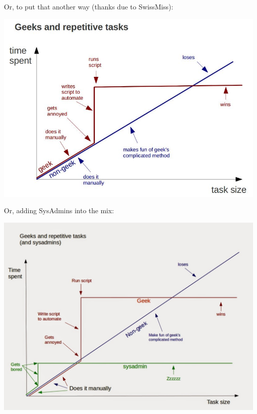 \documentclass[handout]{beamer}
\begin{document}
\begin{frame}
Or, to put that another way
(thanks due to SwissMiss):

\centering
\vspace{10pt}
\includegraphics[height=0.8\textheight]{Geeks.jpg}

\end{frame}


\begin{frame}
Or, adding SysAdmins into the mix:

\centering
\vspace{10pt}
\includegraphics[height=0.8\textheight]{Geeks2.jpg}

\end{frame}
\end{document}
